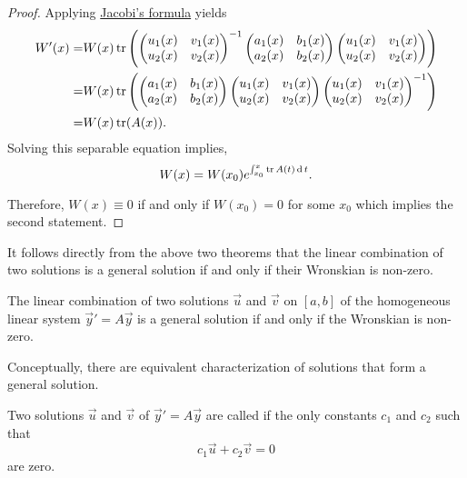\begin{proof}
Applying \href{https://en.wikipedia.org/wiki/Jacobi\%27s_formula}{Jacobi's formula} yields
\[
  \begin{aligned}
    W'(x)=&W(x)\operatorname{tr}\left(\begin{pmatrix}
    u_1(x) & v_1(x)\\
    u_2(x) & v_2(x)
   \end{pmatrix}^{-1}\begin{pmatrix}
    a_1(x) & b_1(x)\\
    a_2(x) & b_2(x)
  \end{pmatrix}\begin{pmatrix}
   u_1(x) & v_1(x)\\
   u_2(x) & v_2(x)
  \end{pmatrix}\right)\\
  =&W(x)\operatorname{tr}\left(\begin{pmatrix}
    a_1(x) & b_1(x)\\
    a_2(x) & b_2(x)
  \end{pmatrix}\begin{pmatrix}
   u_1(x) & v_1(x)\\
   u_2(x) & v_2(x)
  \end{pmatrix}\begin{pmatrix}
    u_1(x) & v_1(x)\\
    u_2(x) & v_2(x)
   \end{pmatrix}^{-1}\right)\\
   =&W(x)\operatorname{tr}(A(x)).
  \end{aligned}
\]
Solving this separable equation implies,
\[W(x)=W(x_0)e^{\int_{x_0}^x\operatorname{tr}{A(t)}\operatorname{d} t}.\]

Therefore, $W(x)\equiv 0$ if and only if $W(x_0)=0$ for some $x_0$ which implies the second statement.
\end{proof}

It follows directly from the above two theorems that the linear combination of two solutions is a general solution if and only if their Wronskian is non-zero.

\begin{theorem}
  The linear combination of two solutions $\vec{u}$ and $\vec{v}$ on $[a, b]$ of the homogeneous linear system $\vec{y}'=A\vec{y}$ is a general solution if and only if the Wronskian is non-zero.
\end{theorem}

Conceptually, there are equivalent characterization of solutions that form a general solution.

Two solutions $\vec{u}$ and $\vec{v}$ of $\vec{y}'=A\vec{y}$ are called  if the only constants $c_1$ and $c_2$ such that
\[c_1\vec{u}+c_2\vec{v}=0\]
are zero.

